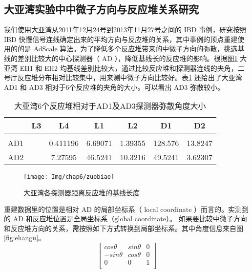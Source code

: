 \subsection{大亚湾实验中中微子方向与反应堆关系研究}
我们使用大亚湾从2011年12月24号到2013年11月27号之间的 IBD 事例，研究按照 IBD 快慢信号连线确定出来的平均方向与反应堆的关系，其中事例的顶点重建使用的的是 AdScale 算法。为了降低多个反应堆带来的中微子方向的弥散，挑选基线的差别比较大的中心探测器（ AD ），降低基线长的反应堆的影响。根据图\ref{fig:baseline} 大亚湾 EH1 和 EH2 均基线差别比较大，通过比较反应堆和探测器连线的夹角，二号厅反应堆分布相对比较集中，用来测中微子方向比较好。表\ref{tab:tcompangu} 还给出了大亚湾 AD1 和 AD3 相对于6个反应堆的夹角的大小。可以看出 AD3 弥散较小。%
\begin{table}[htb]
\centering  %
\begin{tabular}{lcccccc}  %
\hline
&L3 &L4 & L1&L2  &D1 &D2   \\ \hline  %
\\AD1&  &  0.411196 & 6.69071 &  1.39355  & 128.576 & 13.8247    %
\\ AD2  &  & 7.27595   & 46.5241 & 10.3216   &49.5241  & 3.62307 %
\\ \hline
\end{tabular}
\caption{大亚湾6个反应堆相对于AD1及AD3探测器弥散角度大小}
\label{tab:tcompangu}
\end{table}
\begin{figure}[!htb]
  \centering
   \texttt{[image: Img/chap6/zuobiao]}
    \caption{大亚湾各探测器距离反应堆的基线长度}
  \label{fig:baseline}
\end{figure}
重建数据里的位置是相对 AD 的局部坐标系（ local coordinate ）而言的。实测到的 AD 和反应堆位置是全局坐标系（global coordinate）。 如果要比较中微子方向和反应堆方向的关系，需按照如下方式转换到局部坐标系。其中角度信息来自图\ref{fig:ehangu}。
\begin{equation}
\left[
  \begin{array}{ccc}   %
    cos\theta & sin\theta & 0\\  %
    -sin\theta & cos\theta & 0\\  %
    0&0&1\\
  \end{array}
\right]                %
\end{equation}

